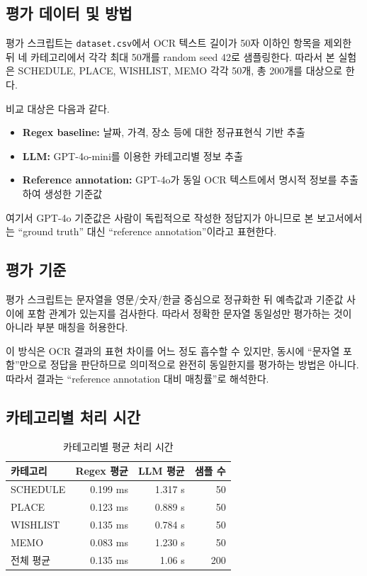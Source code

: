 \documentclass[11pt,a4paper]{article}
\begin{document}
\subsection{평가 데이터 및 방법}

평가 스크립트는 \texttt{dataset.csv}에서 OCR 텍스트 길이가 50자 이하인 항목을 제외한 뒤 네 카테고리에서 각각 최대 50개를 random seed 42로 샘플링한다. 따라서 본 실험은 SCHEDULE, PLACE, WISHLIST, MEMO 각각 50개, 총 200개를 대상으로 한다.

비교 대상은 다음과 같다.

\begin{itemize}
    \item \textbf{Regex baseline:} 날짜, 가격, 장소 등에 대한 정규표현식 기반 추출
    \item \textbf{LLM:} GPT-4o-mini를 이용한 카테고리별 정보 추출
    \item \textbf{Reference annotation:} GPT-4o가 동일 OCR 텍스트에서 명시적 정보를 추출하여 생성한 기준값
\end{itemize}

여기서 GPT-4o 기준값은 사람이 독립적으로 작성한 정답지가 아니므로 본 보고서에서는 ``ground truth'' 대신 ``reference annotation''이라고 표현한다.

\subsection{평가 기준}

평가 스크립트는 문자열을 영문/숫자/한글 중심으로 정규화한 뒤 예측값과 기준값 사이에 포함 관계가 있는지를 검사한다. 따라서 정확한 문자열 동일성만 평가하는 것이 아니라 부분 매칭을 허용한다.

이 방식은 OCR 결과의 표현 차이를 어느 정도 흡수할 수 있지만, 동시에 ``문자열 포함''만으로 정답을 판단하므로 의미적으로 완전히 동일한지를 평가하는 방법은 아니다. 따라서 결과는 ``reference annotation 대비 매칭률''로 해석한다.

\subsection{카테고리별 처리 시간}

\begin{table}[H]
\centering
\small
\begin{tabularx}{0.9\linewidth}{l r r r}
\toprule
\textbf{카테고리} & \textbf{Regex 평균} & \textbf{LLM 평균} & \textbf{샘플 수}\\
\midrule
SCHEDULE & 0.199 ms & 1.317 s & 50\\
PLACE & 0.123 ms & 0.889 s & 50\\
WISHLIST & 0.135 ms & 0.784 s & 50\\
MEMO & 0.083 ms & 1.230 s & 50\\
\midrule
전체 평균 & 0.135 ms & 1.06 s & 200\\
\bottomrule
\end{tabularx}
\caption{카테고리별 평균 처리 시간}
\end{table}
\end{document}
